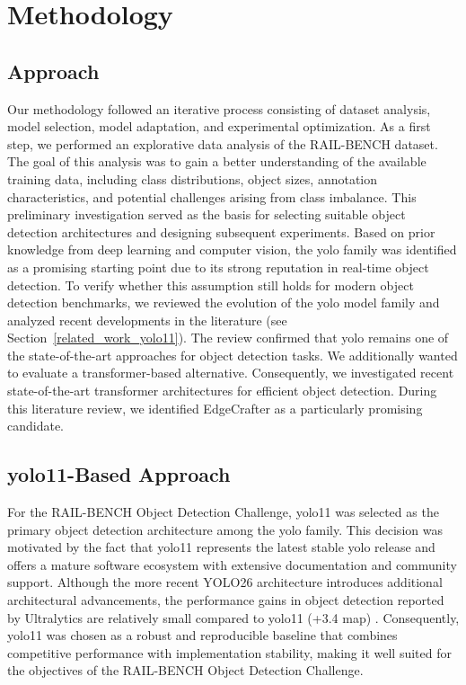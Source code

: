 \chapter{Methodology}
\label{ch:methodology}

\section{Approach}

Our methodology followed an iterative process consisting of dataset analysis, model selection, model adaptation, and experimental optimization. As a first step, we performed an explorative data analysis of the RAIL-BENCH dataset. The goal of this analysis was to gain a better understanding of the available training data, including class distributions, object sizes, annotation characteristics, and potential challenges arising from class imbalance. This preliminary investigation served as the basis for selecting suitable object detection architectures and designing subsequent experiments. Based on prior knowledge from deep learning and computer vision, the \acrshort{yolo} family was identified as a promising starting point due to its strong reputation in real-time object detection. To verify whether this assumption still holds for modern object detection benchmarks, we reviewed the evolution of the \acrshort{yolo} model family and analyzed recent developments in the literature (see Section~\ref{related_work_yolo11}). The review confirmed that \acrshort{yolo} remains one of the state-of-the-art approaches for object detection tasks. We additionally wanted to evaluate a transformer-based alternative. Consequently, we investigated recent state-of-the-art transformer architectures for efficient object detection. During this literature review, we identified EdgeCrafter as a particularly promising candidate.


\section{\acrshort{yolo}11-Based Approach}

For the RAIL-BENCH Object Detection Challenge, \acrshort{yolo}11 was selected as the primary object detection architecture among the \acrshort{yolo} family. This decision was motivated by the fact that \acrshort{yolo}11 represents the latest stable \acrshort{yolo} release and offers a mature software ecosystem with extensive documentation and community support. Although the more recent YOLO26 architecture introduces additional architectural advancements, the performance gains in object detection reported by Ultralytics are relatively small compared to \acrshort{yolo}11 (+3.4 \acrshort{map}) \cite{yolo26}. Consequently, \acrshort{yolo}11 was chosen as a robust and reproducible baseline that combines competitive performance with implementation stability, making it well suited for the objectives of the RAIL-BENCH Object Detection Challenge.

